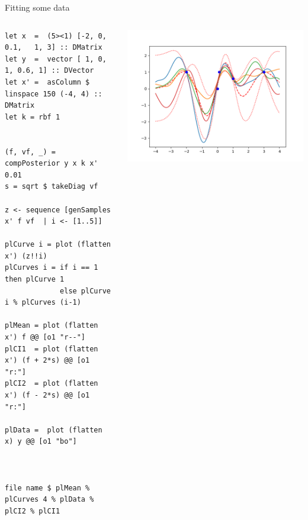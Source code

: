 \documentclass[presentation]{beamer}
\begin{document}
\begin{frame}[fragile,label={sec:orgf3c9180}]{Fitting some data}
 \begin{columns}
\begin{column}{0.37\columnwidth}
\begin{verbatim}
let x  =  (5><1) [-2, 0, 0.1,   1, 3] :: DMatrix
let y  =  vector [ 1, 0,   1, 0.6, 1] :: DVector
let x' =  asColumn $ linspace 150 (-4, 4) :: DMatrix
let k = rbf 1


(f, vf, _) = compPosterior y x k x' 0.01
s = sqrt $ takeDiag vf

z <- sequence [genSamples x' f vf  | i <- [1..5]]

plCurve i = plot (flatten x') (z!!i)
plCurves i = if i == 1 then plCurve 1
             else plCurve i % plCurves (i-1)

plMean = plot (flatten x') f @@ [o1 "r--"]
plCI1  = plot (flatten x') (f + 2*s) @@ [o1 "r:"]
plCI2  = plot (flatten x') (f - 2*s) @@ [o1 "r:"]

plData =  plot (flatten x) y @@ [o1 "bo"]



file name $ plMean % plCurves 4 % plData % plCI2 % plCI1
\end{verbatim}
\end{column}


\begin{column}{0.55\columnwidth}
\begin{center}
\includegraphics[width=.9\linewidth]{images/fig10.png}
\end{center}
\end{column}
\end{columns}
\end{frame}
\end{document}
